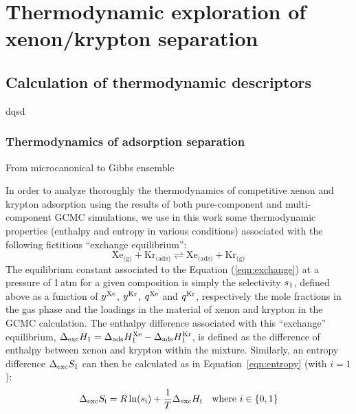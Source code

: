 \documentclass[main]{subfiles}
\begin{document}
\chapter{Thermodynamic exploration of xenon/krypton separation}
\vspace*{-1\baselineskip}

\section{Calculation of thermodynamic descriptors}
dqsd

\subsection{Thermodynamics of adsorption separation}\label{section:exchange}


From microcanonical to Gibbs ensemble


In order to analyze thoroughly the thermodynamics of competitive xenon and krypton adsorption using the results of both pure-component and multi-component GCMC simulations, we use in this work some thermodynamic properties (enthalpy and entropy in various conditions) associated with the following fictitious ``exchange equilibrium'':
\begin{equation} \label{eqn:exchange}
    \text{Xe}_{\text{(g)}} + \text{Kr}_{\text{(ads)}}
    \rightleftharpoons \text{Xe}_{\text{(ads)}} + \text{Kr}_{\text{(g)}}
\end{equation}
The equilibrium constant associated to the Equation (\ref{eqn:exchange}) at a pressure of 1\,atm for a given composition is simply the selectivity $s_{\text{1}}$, defined above as a function of $y^{\text{Xe}}$, $y^{\text{Kr}}$, $q^{\text{Xe}}$ and $q^{\text{Kr}}$, respectively the mole fractions in the gas phase and the loadings in the material of xenon and krypton in the GCMC calculation. The enthalpy difference associated with this ``exchange'' equilibrium, $\Delta_{\text{exc}}H_{\text{1}} = \Delta_{\text{ads}}H_{\text{1}}^{\text{Xe}} - \Delta_{\text{ads}}H_{\text{1}}^{\text{Kr}}$, is defined as the difference of enthalpy between xenon and krypton within the mixture. Similarly, an entropy difference $\Delta_{\text{exc}}S_{\text{1}}$ can then be calculated as in Equation~\ref{eqn:entropy} (with $i = 1$):
\begin{equation} \label{eqn:entropy}
    \Delta\e{exc}S\e{i} = R\ln(s\e{i}) + \dfrac{1}{T}\Delta\e{exc}H\e{i}\ \ \ \mathrm{where}\ i\in\{0,1\}
\end{equation}
\end{document}
